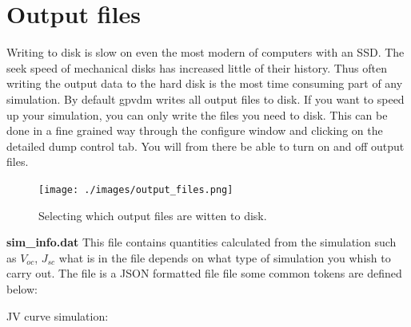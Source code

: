 \documentclass[11pt]{article}
\begin{document}
\section{Output files}
Writing to disk is slow on even the most modern of computers with an SSD.  The seek speed of mechanical disks has increased little of their history.  Thus often writing the output data to the hard disk is the most time consuming part of any simulation.  By default gpvdm writes all output files to disk.  If you want to speed up your simulation, you can only write the files you need to disk.  This can be done in a fine grained way through the configure window and clicking on the detailed dump control tab.  You will from there be able to turn on and off output files.

\begin{figure}
\centering
\texttt{[image: ./images/output\_files.png]}
\caption{Selecting which output files are witten to disk.}
\end{figure}



\textbf{sim\_info.dat}\newline
This file contains quantities calculated from the simulation such as $V_{oc}$, $J_{sc}$ what is in the file depends on what type of simulation you whish to carry out.  The file is a JSON formatted file file some common tokens are defined below:

JV curve simulation:
\end{document}
